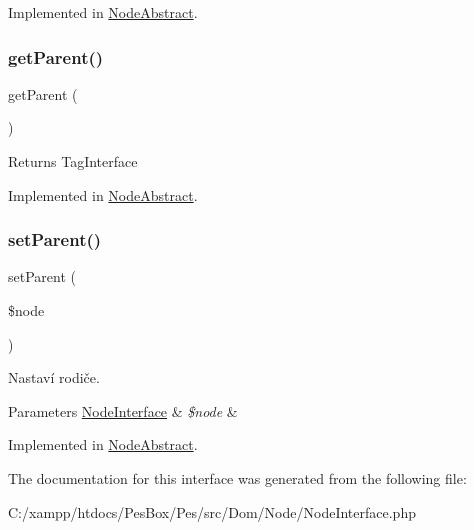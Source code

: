 Implemented in \mbox{\hyperlink{class_pes_1_1_dom_1_1_node_1_1_node_abstract_a3d0963e68bb313b163a73f2803c64600}{Node\+Abstract}}.

\mbox{\label{interface_pes_1_1_dom_1_1_node_1_1_node_interface_a95ecaee3537b1ad29b04ef383a57bbae}} 
\subsubsection{\texorpdfstring{get\+Parent()}{getParent()}}
{\footnotesize\ttfamily get\+Parent (\begin{DoxyParamCaption}{ }\end{DoxyParamCaption})}

\begin{DoxyReturn}{Returns}
Tag\+Interface 
\end{DoxyReturn}


Implemented in \mbox{\hyperlink{class_pes_1_1_dom_1_1_node_1_1_node_abstract_a95ecaee3537b1ad29b04ef383a57bbae}{Node\+Abstract}}.

\mbox{\label{interface_pes_1_1_dom_1_1_node_1_1_node_interface_a3eb7b224ac469e505363e30fd18d3dbb}} 
\subsubsection{\texorpdfstring{set\+Parent()}{setParent()}}
{\footnotesize\ttfamily set\+Parent (\begin{DoxyParamCaption}\item[{\mbox{\hyperlink{interface_pes_1_1_dom_1_1_node_1_1_node_interface}{Node\+Interface}}}]{\$node }\end{DoxyParamCaption})}

Nastaví rodiče. 
\begin{DoxyParams}[1]{Parameters}
\mbox{\hyperlink{interface_pes_1_1_dom_1_1_node_1_1_node_interface}{Node\+Interface}} & {\em \$node} & \\
\hline
\end{DoxyParams}


Implemented in \mbox{\hyperlink{class_pes_1_1_dom_1_1_node_1_1_node_abstract_a3eb7b224ac469e505363e30fd18d3dbb}{Node\+Abstract}}.



The documentation for this interface was generated from the following file\+:\begin{DoxyCompactItemize}
\item 
C\+:/xampp/htdocs/\+Pes\+Box/\+Pes/src/\+Dom/\+Node/Node\+Interface.\+php\end{DoxyCompactItemize}
